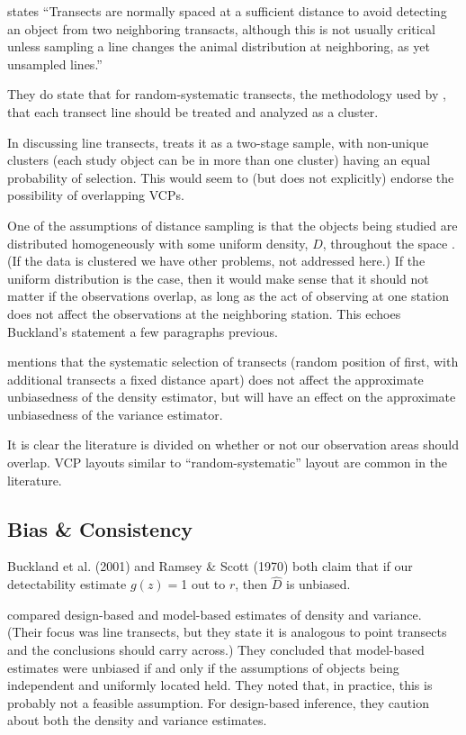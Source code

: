 \documentclass[12pt]{article}
\begin{document}
\textcite[235]{buckland2001} states ``Transects are normally spaced at a sufficient distance to avoid detecting an object from two neighboring transacts, although this is not usually critical unless sampling a line changes the animal distribution at neighboring, as yet unsampled lines.''

They do state that for random-systematic transects, the methodology used by \textcite{micronesian}, that each transect line should be treated and analyzed as a cluster.

In discussing line transects, \textcite{barry2001} treats it as a two-stage sample, with non-unique clusters (each study object can be in more than one cluster) having an equal probability of selection. This would seem to (but does not explicitly) endorse the possibility of overlapping VCPs. 

One of the assumptions of distance sampling is that the objects being studied are distributed homogeneously with some uniform density, $D$, throughout the space \textcite{ramsey1981}.  (If the data is clustered we have other problems, not addressed here.) If the uniform distribution is the case, then it would make sense that it should not matter if the observations overlap, as long as the act of observing at one station does not affect the observations at the neighboring station. This echoes Buckland’s statement a few paragraphs previous.

\textcite[244]{thompson2012} mentions that the systematic selection of transects (random position of first, with additional transects a fixed distance apart) does not affect the approximate unbiasedness of the density estimator, but will have an effect on the approximate unbiasedness of the variance estimator. 

It is clear the literature is divided on whether or not our observation areas should overlap. VCP layouts similar to \textcite{micronesian} ``random-systematic'' layout are common in the literature.

\subsection{Bias \& Consistency}
\textcite{buckland2001,ramsey1979} Buckland et al. (2001) and Ramsey \& Scott (1970) both claim that if our detectability estimate $g(z)=$1 out to $r$, then $\hat{D}$ is unbiased. 

\textcite{barry2001} compared design-based and  model-based estimates of density and variance. (Their focus was line transects, but they state it is analogous to point transects and the conclusions should carry across.) They concluded that model-based estimates were unbiased if and only if the assumptions of objects being independent and uniformly located held. They noted that, in practice, this is probably not a feasible assumption. For design-based inference, they caution about both the density and variance estimates.
\end{document}
